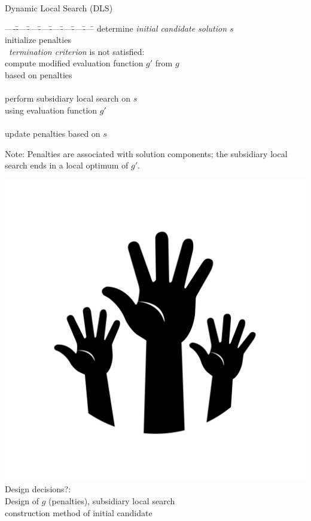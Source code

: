 \begin{frame}[c]{Dynamic Local Search (DLS)}

\begin{tabbing}
----\=----\=----\=----\=----\=----\=----\=----\=\kill
\> determine \emph{initial candidate solution $s$}\\
\> initialize penalties\\
\> \pscWhile\ \emph{termination criterion} is not satisfied:\\
\> \vbar \> compute modified evaluation function $g'$ from $g$ \\[-0.55ex]
\> \vbar \> \>                          based on penalties\\[-0.55ex]
\> \vbar \\[-1.5ex]
\> \vbar \> perform subsidiary local search on $s$ \\[-0.55ex]
\> \vbar \> \>        using evaluation function $g'$ \\[-0.55ex]
\> \vbar \\[-1.5ex]
\> \vend \> update penalties based on $s$
\end{tabbing}

Note: Penalties are associated with solution components; 
the subsidiary local search ends in a local optimum of $g'$.

\medskip
\includegraphics[scale=.03]{images/hands.png}
\alert{Design decisions?}:\\
\pause Design of $g$ (penalties), subsidiary local search \\ 
construction method of initial candidate

\end{frame}
